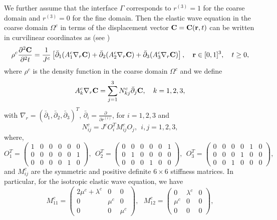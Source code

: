 We further assume that the interface $\Gamma$ corresponds to $r^{(3)} = 1$ for the coarse domain and $r^{(3)} = 0$ for the fine domain. Then the elastic wave equation in the coarse domain $\Omega^c$ in terms of the displacement vector ${\bf C} = {\bf C}({\bf r}, t)$ can be written in curvilinear coordinates as (see \cite{petersson2015wave})
\begin{align}\label{elastic_curvi}
	\rho^c\frac{\partial^2{\bf C}}{\partial^2 t} = \frac{1}{J^c}\left[\bar{\partial}_1(A_1^c\nabla_r{\bf C}) + \bar{\partial}_2(A_2^c\nabla_r{\bf C}) +\bar{\partial}_3(A_3^c\nabla_r{\bf C}) \right],\ \ \  {\bf r}\in[0,1]^3,\ \ \  t\geq0,
\end{align}
where $\rho^c$ is the density function in the coarse domain $\Omega^c$ and we define
\begin{align*} 
A_k^c\nabla_r{\bf C} = \sum_{j = 1}^3 N_{kj}^c\bar{\partial}_j {\bf C}, \ \ \ k = 1,2,3,
\end{align*}
with $\nabla_r  = (\bar{\partial}_1, \bar{\partial}_2, \bar{\partial}_3)^T$,  $\bar{\partial}_i =\frac{\partial}{\partial r^{(i)}}$, for $i = 1,2,3$ and
\begin{equation}\label{N_definition}
	N_{ij}^c = J^cO_i^TM_{ij}^cO_j, \ \ i,j = 1,2,3,
\end{equation}
where, 
\[ O_{1}^T = \left(\begin{array}{cccccc}
1 & 0 & 0 &0 & 0 & 0\\
0 & 0 & 0 &0 & 0 & 1\\
0 & 0 & 0 &0 & 1 & 0\end{array}\right), \ \  O_{2}^T = \left(\begin{array}{cccccc}
0 & 0 & 0 &0 & 0 & 1\\
0 & 1 & 0 &0 & 0 & 0\\
0 & 0 & 0 &1 & 0 & 0\end{array}\right),  \ \ O_{3}^T = \left(\begin{array}{cccccc}
0 & 0 & 0 &0 & 1 & 0\\
0 & 0 & 0 &1 & 0 & 0\\
0 & 0 & 1 &0 & 0 & 0\end{array}\right),\]
and $M_{ij}^c$ are the symmetric and positive definite $6\times 6$ stiffness matrices. In particular, for the isotropic elastic wave equation, we have
\[ M_{11}^c = \left(\begin{array}{ccc}
2\mu^c+\lambda^c & 0 & 0\\
0 & \mu^c & 0\\
0 & 0 & \mu^c\end{array}\right),\ \ \  M_{12}^c = \left(\begin{array}{ccc}
0 & \lambda^c & 0\\
\mu^c & 0 & 0\\
0 & 0 & 0\end{array}\right), \]

